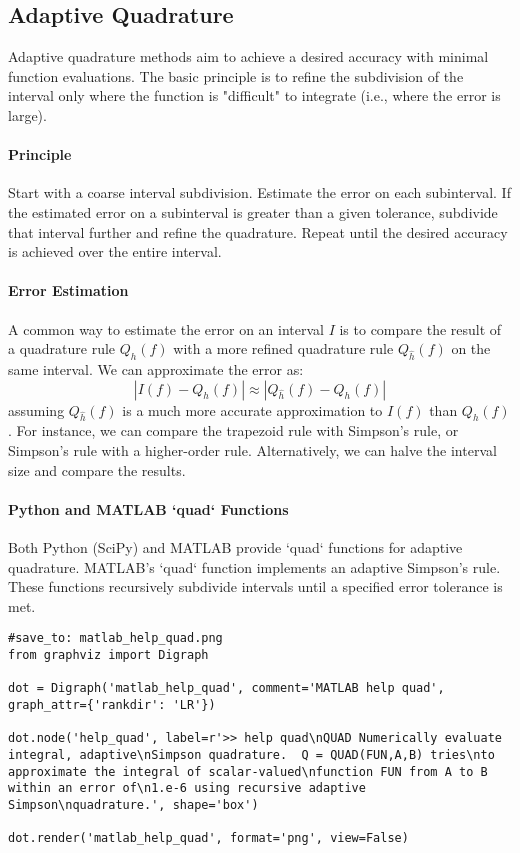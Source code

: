 \documentclass{article}
\begin{document}
\subsection{Adaptive Quadrature}

Adaptive quadrature methods aim to achieve a desired accuracy with minimal function evaluations. The basic principle is to refine the subdivision of the interval only where the function is "difficult" to integrate (i.e., where the error is large).

\paragraph{Principle}
Start with a coarse interval subdivision. Estimate the error on each subinterval. If the estimated error on a subinterval is greater than a given tolerance, subdivide that interval further and refine the quadrature. Repeat until the desired accuracy is achieved over the entire interval.

\paragraph{Error Estimation}
A common way to estimate the error on an interval $I$ is to compare the result of a quadrature rule $Q_h(f)$ with a more refined quadrature rule $Q_{\hat{h}}(f)$ on the same interval.  We can approximate the error as:
\[
|I(f) - Q_h(f)| \approx |Q_{\hat{h}}(f) - Q_h(f)|
\]
assuming $Q_{\hat{h}}(f)$ is a much more accurate approximation to $I(f)$ than $Q_h(f)$. For instance, we can compare the trapezoid rule with Simpson's rule, or Simpson's rule with a higher-order rule. Alternatively, we can halve the interval size and compare the results.

\paragraph{Python and MATLAB `quad` Functions}
Both Python (SciPy) and MATLAB provide `quad` functions for adaptive quadrature. MATLAB's `quad` function implements an adaptive Simpson's rule. These functions recursively subdivide intervals until a specified error tolerance is met.

\begin{verbatim}
#save_to: matlab_help_quad.png
from graphviz import Digraph

dot = Digraph('matlab_help_quad', comment='MATLAB help quad', graph_attr={'rankdir': 'LR'})

dot.node('help_quad', label=r'>> help quad\nQUAD Numerically evaluate integral, adaptive\nSimpson quadrature.  Q = QUAD(FUN,A,B) tries\nto approximate the integral of scalar-valued\nfunction FUN from A to B within an error of\n1.e-6 using recursive adaptive Simpson\nquadrature.', shape='box')

dot.render('matlab_help_quad', format='png', view=False)
\end{verbatim}
\end{document}
